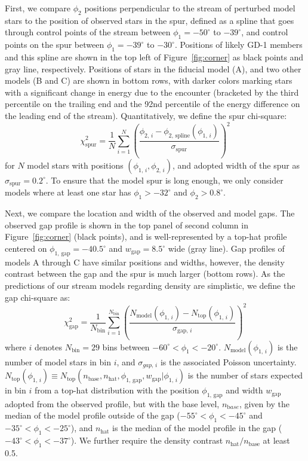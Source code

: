 \documentclass[twocolumn]{aastex62}
\begin{document}
First, we compare $\phi_2$ positions perpendicular to the stream of perturbed model stars to the position of observed stars in the spur, defined as a spline that goes through control points of the stream between $\phi_1=-50^\circ$ to $-39^\circ$, and control points on the spur between $\phi_1=-39^\circ$ to $-30^\circ$.
Positions of likely GD-1 members and this spline are shown in the top left of Figure~\ref{fig:corner} as black points and gray line, respectively.
Positions of stars in the fiducial model (A), and two other models (B and C) are shown in bottom rows, with darker colors marking stars with a significant change in energy due to the encounter (bracketed by the third percentile on the trailing end and the 92nd percentile of the energy difference on the leading end of the stream). 
Quantitatively, we define the spur chi-square:
\begin{equation}
\chi^2_\mathrm{spur} = \frac{1}{N}\sum_{i=1}^{N} \left(\frac{\phi_{2,\,i} - \phi_\mathrm{2,\,spline}(\phi_{1,\,i})}{\sigma_\mathrm{spur}}\right)^2 
\end{equation}
for $N$ model stars with positions $(\phi_{1,\,i}, \phi_{2,\,i})$, and adopted width of the spur as $\sigma_\mathrm{spur} = 0.2^\circ$.
To ensure that the model spur is long enough, we only consider models where at least one star has $\phi_1>-32^\circ$ and $\phi_2>0.8^\circ$.

Next, we compare the location and width of the observed and model gaps.
The observed gap profile is shown in the top panel of second column in Figure~\ref{fig:corner} (black points), and is well-represented by a top-hat profile centered on $\phi_\mathrm{1,\,gap}=-40.5^\circ$ and $w_\mathrm{gap}=8.5^\circ$ wide (gray line).
Gap profiles of models A through C have similar positions and widths, however, the density contrast between the gap and the spur is much larger (bottom rows).
As the predictions of our stream models regarding density are simplistic, we define the gap chi-square as:
\begin{equation}
\chi^2_\mathrm{gap} = \frac{1}{N_\mathrm{bin}}\sum_{i=1}^{N_\mathrm{bin}} \left(\frac{N_\mathrm{model}(\phi_{1,\,i}) - N_\mathrm{top}(\phi_{1,\,i})}{\sigma_\mathrm{gap,\,\mathit{i}}}\right)^2
\end{equation}
where $i$ denotes $N_\mathrm{bin}=29$ bins between $-60^\circ<\phi_1<-20^\circ$.
$N_\mathrm{model}(\phi_{1,\,i})$ is the number of model stars in bin $i$, and $\sigma_{gap,\,i}$ is the associated Poisson uncertainty.
$N_\mathrm{top}(\phi_{1,\,i})\equiv N_\mathrm{top}(n_\mathrm{base}, n_\mathrm{hat}, \phi_\mathrm{1,\, gap}, w_\mathrm{gap} | \phi_{1,\,i})$ is the number of stars expected in bin $i$ from a top-hat distribution with the position $\phi_\mathrm{1,\,gap}$ and width $w_\mathrm{gap}$ adopted from the observed profile, but with the base level, $n_{\mathrm base}$, given by the median of the model profile outside of the gap ($-55^\circ<\phi_1<-45^\circ$ and $-35^\circ<\phi_1<-25^\circ$), and $n_\mathrm{hat}$ is the median of the model profile in the gap ($-43^\circ<\phi_1<-37^\circ$).
We further require the density contrast $n_\mathrm{hat} / n_\mathrm{base}$ at least 0.5.
\end{document}
